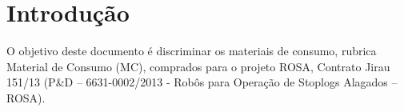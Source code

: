 

\section{Introdução}
\label{introducao}

O objetivo deste documento é discriminar os materiais de consumo, rubrica
Material de Consumo (MC), comprados para o projeto ROSA, Contrato Jirau 151/13
(P\&D – 6631-0002/2013 - Robôs para Operação de Stoplogs Alagados – ROSA).
